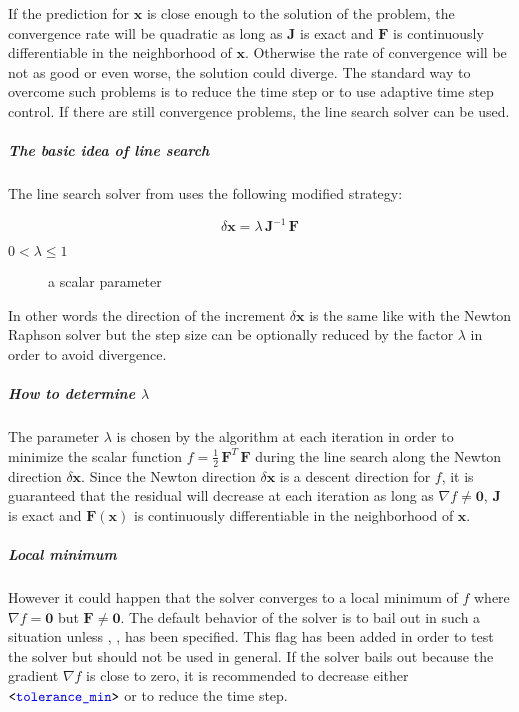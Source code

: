 If the prediction for $\boldsymbol{x}$ is close enough to the solution of the problem, the convergence rate will be quadratic as long as $\boldsymbol{J}$ is exact and $\boldsymbol{F}$ is continuously differentiable in the neighborhood of $\boldsymbol{x}$. Otherwise the rate of convergence will be not as good or even worse, the solution could diverge. The standard way to overcome such problems is to reduce the time step or to use adaptive time step control. If there are still convergence problems, the line search solver can be used.

\subparagraph{The basic idea of line search}
The line search solver from \cite{NUMERICAL-RECIPES-IN-C} uses the following modified strategy:

\begin{equation}
\delta\boldsymbol{x}=\lambda\,\boldsymbol{J}^{-1}\,\boldsymbol{F}
\end{equation}

\begin{description}
\item[$0 < \lambda \le 1$] a scalar parameter
\end{description}

In other words the direction of the increment $\delta\boldsymbol{x}$ is the same like with the Newton Raphson solver but the step size can be optionally reduced by the factor $\lambda$ in order to avoid divergence.

\subparagraph{How to determine $\lambda$}
The parameter $\lambda$ is chosen by the algorithm at each iteration in order to minimize the scalar function $f=\frac{1}{2}\,\boldsymbol{F}^T\,\boldsymbol{F}$ during the line search along the Newton direction $\delta\boldsymbol{x}$. Since the Newton direction $\delta\boldsymbol{x}$ is a descent direction for $f$, it is guaranteed that the residual will decrease at each iteration as long as $\nabla f \neq \boldsymbol{0}$, $\boldsymbol{J}$ is exact and $\boldsymbol{F}\left(\boldsymbol{x}\right)$ is continuously differentiable in the neighborhood of $\boldsymbol{x}$.

\subparagraph{Local minimum}
However it could happen that the solver converges to a local minimum of $f$ where $\nabla f = \boldsymbol{0}$ but $\boldsymbol{F} \neq \boldsymbol{0}$.
The default behavior of the solver is to bail out in such a situation unless , ,  has been specified. This flag has been added in order to test the solver but should not be used in general. If the solver bails out because the gradient $\nabla f$ is close to zero, it is recommended to decrease either $\texttt{<\textcolor{blue}{tolerance\_min}>}$ or to reduce the time step.

